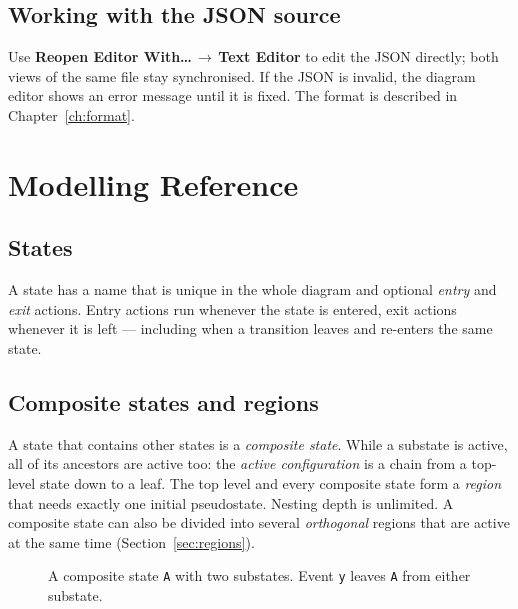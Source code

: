 \documentclass[11pt,a4paper,openany]{report}
\newcommand{\ui}[1]{\textsf{\textbf{#1}}}
\newcommand{\code}[1]{\texttt{#1}}
\begin{document}
\section{Working with the JSON source}
Use \ui{Reopen Editor With\dots}\,$\rightarrow$\,\ui{Text Editor} to edit the JSON directly; both views
of the same file stay synchronised. If the JSON is invalid, the diagram editor shows an error message
until it is fixed. The format is described in Chapter~\ref{ch:format}.

\chapter{Modelling Reference}
\label{ch:model}

\section{States}
A state has a name that is unique in the whole diagram and optional \emph{entry} and \emph{exit}
actions. Entry actions run whenever the state is entered, exit actions whenever it is left ---
including when a transition leaves and re-enters the same state.

\section{Composite states and regions}
A state that contains other states is a \emph{composite state}. While a substate is active, all of its
ancestors are active too: the \emph{active configuration} is a chain from a top-level state down to a
leaf. The top level and every composite state form a \emph{region} that needs exactly one initial
pseudostate. Nesting depth is unlimited. A composite state can also be divided into several
\emph{orthogonal} regions that are active at the same time (Section~\ref{sec:regions}).

\begin{figure}[H]
\centering
{}
\caption{A composite state \code{A} with two substates. Event \code{y} leaves \code{A} from either
substate.}
\end{figure}
\end{document}
